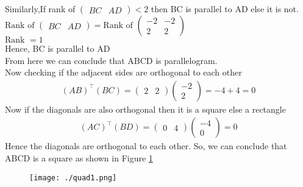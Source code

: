 \documentclass[12pt]{article}
\newcommand{\myvec}[1]{\ensuremath{\begin{pmatrix}#1\end{pmatrix}}}
\begin{document}
\begin{enumerate}
	Similarly,If rank of $\myvec{BC & AD} < 2$ then BC is parallel to AD else it is not.\\
	$\text{Rank of } \myvec{BC & AD} = \text{Rank of }\myvec{-2&-2\\2&2}$\\
	$\text{Rank } = 1$\\
	Hence, BC is parallel to AD\\
	From here we can conclude that ABCD is parallelogram.\\
	Now checking if the adjacent sides are orthogonal to each other
	\begin{align}
		(AB)^\top (BC) = \myvec{2&2} \myvec{-2\\2} = -4+4 = 0
	\end{align}
	Now if the diagonals are also orthogonal then it is a square else a rectangle
	\begin{align}
		(AC)^\top (BD) = \myvec{0&4} \myvec{-4\\0} = 0
	\end{align}
	Hence the diagonals are orthogonal to each other.
	So, we can conclude that ABCD is a square as shown in Figure \ref{fig:Fig1}
 
\begin{figure}[!h]
	\begin{center} 
	    \texttt{[image: ./quad1.png]}
	\end{center}
\caption{}
\label{fig:Fig1}
\end{figure}


\end{enumerate}
\end{document}
